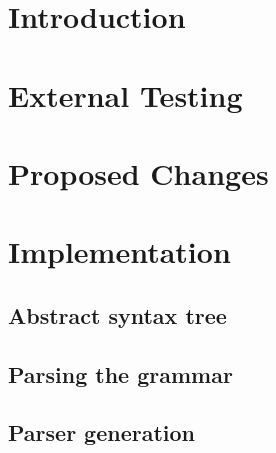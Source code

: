\section{Introduction}


\section{External Testing}


\section{Proposed Changes}


\section{Implementation}


\subsection{Abstract syntax tree}


\subsection{Parsing the grammar}


\subsection{Parser generation}


% 




